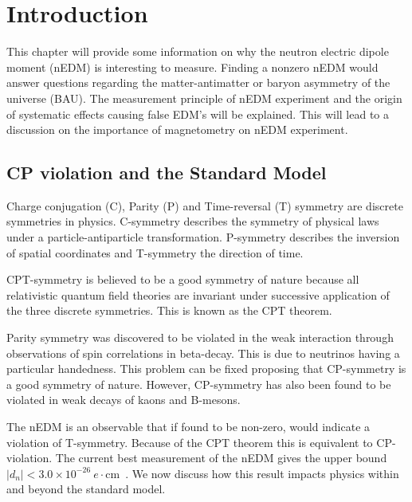 \chapter{Introduction\label{ch:intro}}

This chapter will provide some information on why the neutron electric
dipole moment (nEDM) is interesting to measure.  Finding a nonzero
nEDM would answer questions regarding the matter-antimatter or baryon
asymmetry of the universe (BAU).  The measurement principle of nEDM
experiment and the origin of systematic effects causing false EDM's
will be explained.  This will lead to a discussion on the importance
of magnetometry on nEDM experiment.

\section{CP violation and the Standard Model}

Charge conjugation (C), Parity (P) and Time-reversal (T) symmetry are
discrete symmetries in physics.  C-symmetry describes the symmetry of
physical laws under a particle-antiparticle transformation.
P-symmetry describes the inversion of spatial coordinates and
T-symmetry the direction of time.

CPT-symmetry is believed to be a good symmetry of nature because all
relativistic quantum field theories are invariant under successive
application of the three discrete symmetries.  This is known as the
CPT theorem.

Parity symmetry was discovered to be violated in the weak interaction
through observations of spin correlations in beta-decay.  This is due
to neutrinos having a particular handedness.  This problem can be
fixed proposing that CP-symmetry is a good symmetry of nature.
However, CP-symmetry has also been found to be violated in weak decays
of kaons and B-mesons.

The nEDM is an observable that if found to be non-zero, would indicate
a violation of T-symmetry.  Because of the CPT theorem this is
equivalent to CP-violation.  The current best measurement of the nEDM
gives the upper bound $|d_n|<3.0\times
10^{-26}~e\cdot$cm~\cite{bib:baker,bib:pendlebury-revised}.
We now discuss how this result impacts physics within and beyond the
standard model.

